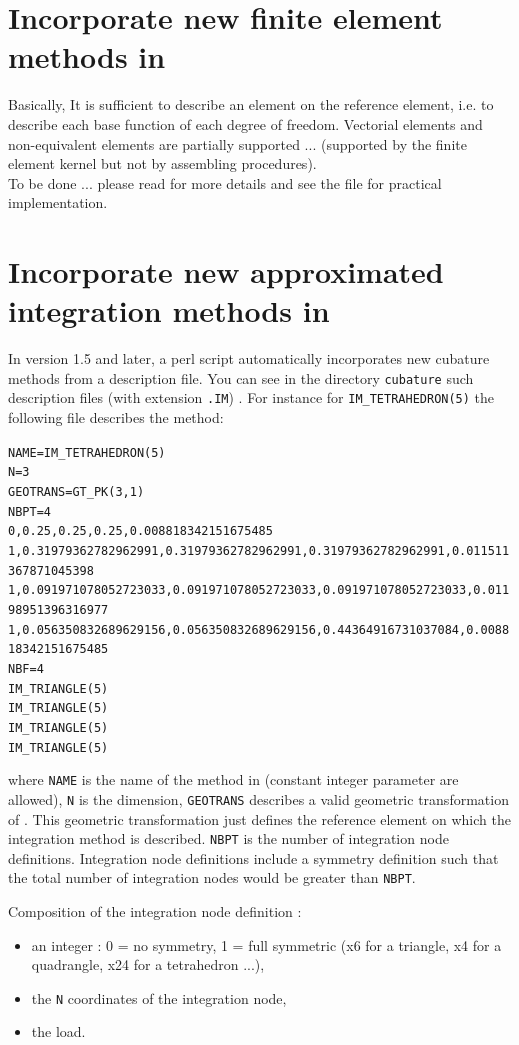 \documentclass[11pt,a4paper]{article}
\begin{document}
\section{Incorporate new finite element methods in \gf }

Basically, It is sufficient to describe an element on the reference element, i.e. to describe each base function of each degree of freedom. Vectorial elements and non-equivalent elements are partially supported ... (supported by the finite element kernel but not by assembling procedures).\\[0.5cm]
To be done ... please read \cite{BASCOMP} for more details and see the file  for practical implementation.

\section{Incorporate new approximated integration methods in \gf }

In \gf version 1.5 and later, a perl script automatically incorporates new cubature methods from a description file. You can see in the directory {\tt cubature} such description files (with extension {\tt.IM}) . For instance for {\tt IM_TETRAHEDRON(5)} the following file describes the method:

\begin{alltt}
NAME = IM_TETRAHEDRON(5)
N = 3
GEOTRANS = GT_PK(3,1)
NBPT = 4
0, 0.25, 0.25, 0.25, 0.008818342151675485
1, 0.31979362782962991, 0.31979362782962991, 0.31979362782962991, 0.011511367871045398 
1, 0.091971078052723033, 0.091971078052723033, 0.091971078052723033, 0.01198951396316977
1, 0.056350832689629156, 0.056350832689629156, 0.44364916731037084, 0.008818342151675485
NBF = 4
IM_TRIANGLE(5)
IM_TRIANGLE(5)
IM_TRIANGLE(5)
IM_TRIANGLE(5)
\end{alltt}

where {\tt NAME} is the name of the method in \gf (constant integer parameter are allowed), {\tt N} is the dimension, {\tt GEOTRANS} describes a valid geometric transformation of \gf. This geometric transformation just defines the reference element on which the integration method is described. {\tt NBPT} is the number of integration node definitions. Integration node definitions include a symmetry definition such that the total number of integration nodes would be greater than {\tt NBPT}.

Composition of the integration node definition :
\begin{itemize}
  \item an integer : 0 = no symmetry, 1 = full symmetric (x6 for a triangle, x4 for a quadrangle, x24 for a tetrahedron ...),
  \item the {\tt N} coordinates of the integration node,
  \item the load.
\end{itemize}
\end{document}
